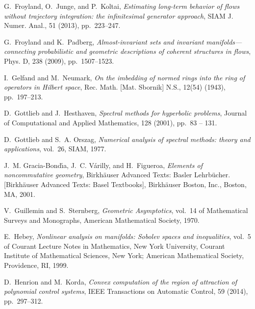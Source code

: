 \documentclass[final,leqno]{siamart}
\begin{document}
\begin{thebibliography}{10}
{\sc G.~Froyland, O.~Junge, and P.~Koltai}, {\em Estimating long-term behavior
  of flows without trajectory integration: the infinitesimal generator
  approach}, SIAM J. Numer. Anal., 51 (2013), pp.~223--247.

{\sc G.~Froyland and K.~Padberg}, {\em Almost-invariant sets and invariant
  manifolds---connecting probabilistic and geometric descriptions of coherent
  structures in flows}, Phys. D, 238 (2009), pp.~1507--1523.

{\sc I.~Gelfand and M.~Neumark}, {\em On the imbedding of normed rings into the
  ring of operators in {H}ilbert space}, Rec. Math. [Mat. Sbornik] N.S., 12(54)
  (1943), pp.~197--213.

{\sc D.~Gottlieb and J.~Hesthaven}, {\em Spectral methods for hyperbolic
  problems}, Journal of Computational and Applied Mathematics, 128 (2001),
  pp.~83 -- 131.

{\sc D.~Gottlieb and S.~A. Orszag}, {\em Numerical analysis of spectral
  methods: theory and applications}, vol.~26, SIAM, 1977.

{\sc J.~M. Gracia-Bond{\'{\i}}a, J.~C. V{\'a}rilly, and H.~Figueroa}, {\em
  Elements of noncommutative geometry}, Birkh\"auser Advanced Texts: Basler
  Lehrb\"ucher. [Birkh\"auser Advanced Texts: Basel Textbooks], Birkh\"auser
  Boston, Inc., Boston, MA, 2001.

{\sc V.~Guillemin and S.~Sternberg}, {\em Geometric Asymptotics}, vol.~14 of
  Mathematical Surveys and Monographs, American Mathematical Society, 1970.

{\sc E.~Hebey}, {\em Nonlinear analysis on manifolds: {S}obolev spaces and
  inequalities}, vol.~5 of Courant Lecture Notes in Mathematics, New York
  University, Courant Institute of Mathematical Sciences, New York; American
  Mathematical Society, Providence, RI, 1999.

{\sc D.~Henrion and M.~Korda}, {\em Convex computation of the region of
  attraction of polynomial control systems}, IEEE Transactions on Automatic
  Control, 59 (2014), pp.~297--312.



\end{thebibliography}
\end{document}
